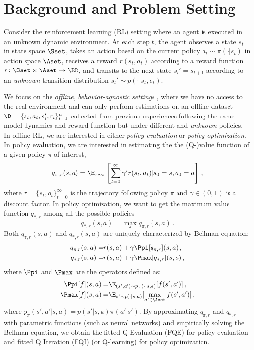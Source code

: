 \section{Background and Problem Setting}
Consider the reinforcement learning (RL) setting where an agent is executed in an unknown dynamic environment.
At each step $t$, the agent observes a state $s_t$ in state space $\Sset$, takes an action based on the current policy
$a_t\sim \pi(\cdot|s_t)$ in action space $\Aset$, 
 receives a reward $r(s_t, a_t)$ according to a reward function $r\colon \Sset \times \Aset \to \RR$,  and transits to the next state $s_t' = s_{t+1}$ according to an \emph{unknown} transition distribution $s_t'\sim p(\cdot|s_t,a_t)$.


We focus on the \emph{offline, behavior-agnostic settings} \citep[e.g.,][]{nachum2019dualdice,zhang2020gendice,levine2020offline}, 
where we have no access to the real environment and 
can only perform  estimations on an 
offline dataset $\D = \{s_i, a_i, s_i', r_i\}_{i=1}^n$ 
collected from previous experiences following the same model dynamics and reward function 
but under different and \emph{unknown} policies. 
In offline RL, we are interested in either \emph{policy evaluation} or \emph{policy optimization}. 
In policy evaluation, we are interested in estimating the 
the (Q-)value function of a given policy $\pi$ of interest,  
\begin{equation}\label{eqn:defineq}
    q_{\pi,r}(s,a) = \E_{\tau \sim \pi}
    \left [\sum_{t=0}^{\infty} \gamma^t r(s_t, a_t)|s_0 = s, a_0 = a \right ]\,,
\end{equation}
where $\tau = \{s_t, a_t\}_{t=0}^{\infty}$ is the trajectory following policy $\pi$ and $\gamma \in (0,1)$ is a discount factor. 
In policy optimization, we want to get the maximum value function  $q_{*,r}$ among all the possible policies 
\begin{equation*}
    q_{*,r}(s,a) = \max_\pi q_{\pi, r}(s,a)\,.
\end{equation*} 
Both $q_{\pi, r}(s,a)$ and $q_{*, r}(s,a)$ are uniquely characterized by Bellman equation: 
\begin{align}
q_{\pi,r}(s,a) =& r(s,a) + \gamma \Ppi[q_{\pi,r}](s,a) \label{eqn:bellman_qpi}\,,\\
q_{*,r}(s,a) =& r(s,a) + \gamma \Pmax[q_{*,r}](s,a) \label{eqn:bellman_qmax}\,,
\end{align}
where $\Ppi$ and $\Pmax$ are the operators defined as:
\begin{align}
    \Ppi[f](s,a) =& \E_{(s',a')\sim p_\pi(\cdot|s,a)} [f(s',a')]\,, \label{equ:ppidef}\\
    \Pmax[f](s,a) =& \E_{s'\sim p(\cdot|s,a)} [\max_{a'\in \Aset} f(s',a')]\,, \label{equ:pmaxdef}
\end{align}
where $p_\pi(s',a'|s,a) = p(s'|s,a)\pi(a'|s')$. 
By approximating $q_{\pi,r}$ and $q_{*,r}$ with parametric functions (such as neural networks) and 
empirically solving the Bellman equation, we 
obtain the fitted Q Evaluation (FQE) for policy evaluation
and fitted Q Iteration (FQI) (or Q-learning) for policy optimization. 

